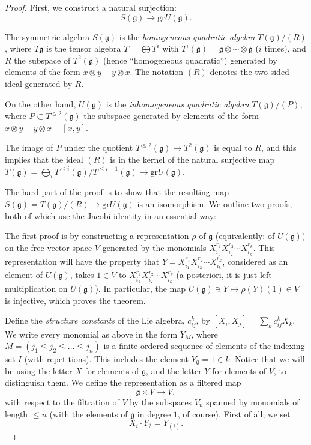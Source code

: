 \begin{proof}
First, we construct a natural surjection:
$$ S(\mathfrak g)\to \text{gr} U(\mathfrak g).$$

The symmetric algebra $S(\mathfrak g)$ is the \emph{homogeneous quadratic algebra} $T(\mathfrak g)/(R)$, where $T\mathfrak g$ is the tensor algebra $T = \bigoplus T^i$ with $T^i(\mathfrak g) = \mathfrak g \otimes \cdots \otimes \mathfrak g$ ($i$ times), and $R$ the subspace of $T^2(\mathfrak g)$ (hence ``homogeneous quadratic'') generated by elements of the form $x\otimes y - y\otimes x$. The notation $(R)$ denotes the two-sided ideal generated by $R$.

On the other hand, $U(\mathfrak g)$ is the \emph{inhomogeneous quadratic algebra} $T(\mathfrak g)/(P)$, where $P\subset T^{\le 2}(\mathfrak g)$ the subspace generated by elements of the form $x\otimes y - y\otimes x -[x,y]$. 

The image of $P$ under the quotient $T^{\le 2}(\mathfrak g) \to T^2(\mathfrak g)$ is equal to $R$, and this implies that the ideal $(R)$ is in the kernel of the natural surjective map $T(\mathfrak g) = \bigoplus_i T^{\le i}(\mathfrak g)/T^{\le i-1}(\mathfrak g) \to \text{gr} U(\mathfrak g)$. 

The hard part of the proof is to show that the resulting map $S(\mathfrak g) = T(\mathfrak g)/(R) \to \text{gr} U(\mathfrak g)$ is an isomorphism. We outline two proofs, both of which use the Jacobi identity in an essential way:

The first proof is by constructing a representation $\rho$ of $\mathfrak g$ (equivalently: of $U(\mathfrak g)$) on the free vector space $V$ generated by the monomials $X_{i_1}^{r_1}X_{i_2}^{r_2}\cdots X_{i_k}^{r_k}$. This representation will have the property that $Y=X_{i_1}^{r_1}X_{i_2}^{r_2}\cdots X_{i_k}^{r_k}$, considered as an element of $U(\mathfrak g)$, takes $1 \in V$ to $X_{i_1}^{r_1}X_{i_2}^{r_2}\cdots X_{i_k}^{r_k}$ (a posteriori, it is just left multiplication on $U(\mathfrak g)$). In particular, the map $U(\mathfrak g)\ni Y \mapsto \rho(Y)(1)\in  V$ is injective, which proves the theorem.

Define the {\it structure constants} of the Lie algebra, $c_{ij}^k$, by $[X_i,X_j]=\sum_k c_{ij}^k X_k$.
We write every monomial as above in the form $Y_M$, where $M = (j_1 \le j_2 \le\dots \le j_n)$ is a finite ordered sequence of elements of the indexing set $I$ (with repetitions). This includes the element $Y_\emptyset = 1\in k$. Notice that we will be using the letter $X$ for elements of $\mathfrak g$, and the letter $Y$ for elements of $V$, to distinguish them. We define the representation as a filtered map 
$$ \mathfrak g \times V\to  V,$$ 
with respect to the filtration of $V$ by the subspaces $V_n$ spanned by monomials of length $\le n$ (with the elements of $\mathfrak g$ in degree $1$, of course). First of all, we set 
$$X_i \cdot Y_\emptyset = Y_{(i)}.$$


\end{proof}
